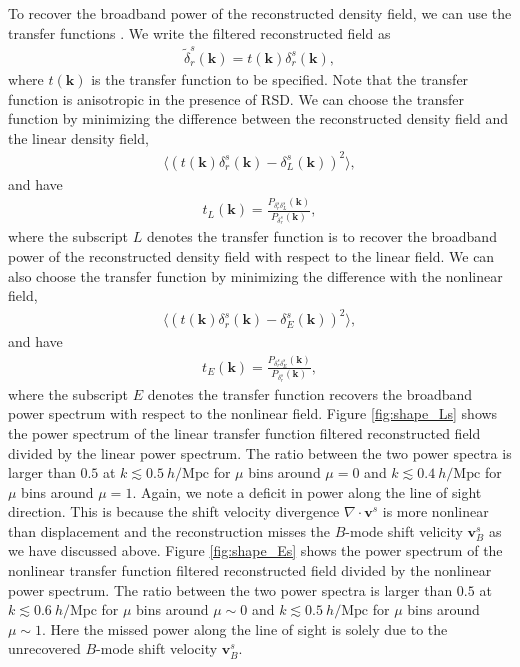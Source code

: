 \documentclass[aps,prd,twocolumn,superscriptaddress,groupedaddress,nofootinbib,amsfont]{revtex4}  %
\newcommand{\mr}{\mathrm}
\newcommand{\bea}{\begin{eqnarray}}
\newcommand{\eea}{\end{eqnarray}}
\newcommand{\bmv}{\bm{v}}
\newcommand{\bmk}{\bm{k}}
\newcommand{\la}{\langle}
\newcommand{\ra}{\rangle}
\begin{document}
To recover the broadband power of the reconstructed density field, we can use 
the transfer functions \cite{2017Marcel}. We write the filtered reconstructed
field as
\bea
\tilde{\delta}_{r}^s(\bmk)=t(\bmk)\delta_r^s(\bmk),
\eea
where $t(\bmk)$ is the transfer function to be specified. Note that the transfer
function is anisotropic in the presence of RSD. 
We can choose the transfer function by minimizing the difference between the 
reconstructed density field and the linear density field,
\bea
\la(t(\bmk){\delta}_r^s(\bmk)-\delta_L^s(\bmk))^2\ra,
\eea
and have 
\bea
t_L(\bmk)=\frac{P_{\delta_r^s\delta_L^s}(\bmk)}{P_{\delta_r^s}(\bmk)},
\eea
where the subscript $L$ denotes the transfer function is to recover the broadband power of the reconstructed density field with respect to the linear field. 
We can also choose the transfer function by minimizing the difference with the
nonlinear field,
\bea
\la(t(\bmk)\delta_r^s(\bmk)-\delta_E^s(\bmk))^2\ra,
\eea
and have 
\bea
t_E(\bmk)=\frac{P_{\delta_r^s\delta_E^s}(\bmk)}{P_{\delta_r^s}(\bmk)},
\eea
where the subscript $E$ denotes the transfer function recovers the broadband
power spectrum with respect to the nonlinear field.
Figure \ref{fig:shape_Ls} shows the power spectrum of the linear transfer 
function filtered reconstructed field divided by the linear power spectrum.
The ratio between the two power spectra is larger than $0.5$ at $k\lesssim0.5\ h/\mr{Mpc}$ for $\mu$ bins around $\mu=0$ and $k\lesssim0.4\ h/\mr{Mpc}$ for
$\mu$ bins around $\mu=1$. Again, we note a deficit in power along the line of
sight direction. This is because the shift velocity divergence 
$\nabla\cdot\bmv^s$ is more nonlinear than displacement and the reconstruction
misses the $B$-mode shift velicity $\bmv^s_B$ as we have discussed above.
Figure \ref{fig:shape_Es} shows the power spectrum of the nonlinear transfer
function filtered reconstructed field divided by the nonlinear power spectrum.
The ratio between the two power spectra is larger than $0.5$ at $k\lesssim0.6\ h/\mr{Mpc}$ for $\mu$ bins around $\mu\sim0$ and $k\lesssim0.5\ h/\mr{Mpc}$ for
$\mu$ bins around $\mu\sim1$. Here the missed power along the line of sight is
solely due to the unrecovered $B$-mode shift velocity $\bmv^s_B$.
\end{document}
